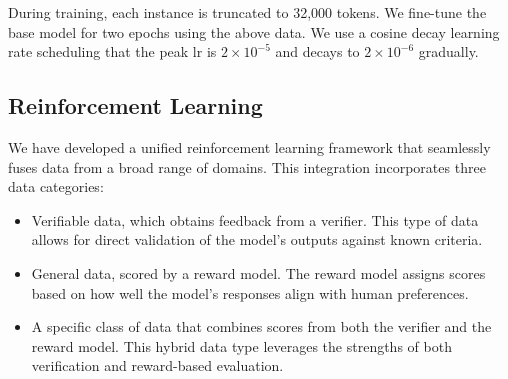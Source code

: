 During training, each instance is truncated to 32,000 tokens. We fine-tune the base model for two epochs using the above data. We use a cosine decay learning rate scheduling that the peak lr is $2 \times 10^{-5}$ and decays to $2 \times 10^{-6}$ gradually. 
 




\subsection{Reinforcement Learning}

We have developed a unified reinforcement learning framework that seamlessly fuses data from a broad range of domains. This integration incorporates three data categories:
\begin{itemize}
    \item Verifiable data, which obtains feedback from a verifier. This type of data allows for direct validation of the model's outputs against known criteria.
    \item General data, scored by a reward model. The reward model assigns scores based on how well the model's responses align with human preferences.
    \item A specific class of data that combines scores from both the verifier and the reward model. This hybrid data type leverages the strengths of both verification and reward-based evaluation.
\end{itemize}

